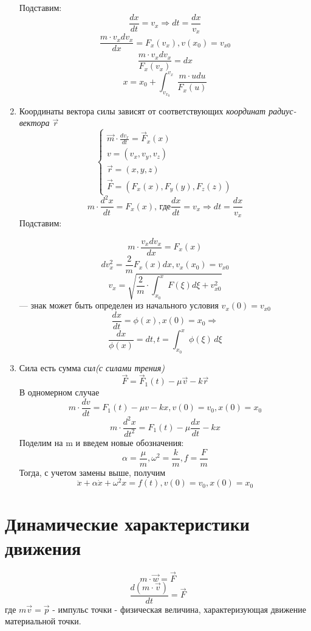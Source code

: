 \documentclass[12pt,a4paper]{report}
\begin{document}
\begin{enumerate}
          Подставим:
          \[ \frac{dx}{dt} = v_x \Rightarrow dt = \frac{dx}{v_x} \]
          \[ \frac{m \cdot v_xdv_x}{dx} = F_x(v_x), v(x_0) = v_{x0} \]
          \[ \frac{m \cdot v_xdv_x}{F_x(v_x)} = dx\]
          \[x = x_0 + \int_{v_{x_0}}^{v_x} \frac{m \cdot udu}{F_x(u)} \]
    \item Координаты вектора силы зависят от соответствующих \textit{координат радиус-вектора $\vec r$}
          \[
              \begin{cases}
                  \vec m \cdot \frac{dv_x}{dt} = \vec F_x(x) \\
                  v = (v_x, v_y, v_z)                        \\
                  \vec r = (x,y,z)                           \\
                  \vec F = (F_x(x), F_y(y), F_z(z))
              \end{cases}
          \]
          \[m \cdot \frac{d^2x}{dt} = F_x(x) \text{, где} \frac{dx}{dt} = v_x \Rightarrow dt = \frac{dx}{v_x}\]
          Подставим:

          \[m\cdot \frac{v_xdv_x}{dx} = F_x(x)\]
          \[dv_x^2 = \frac{2}{m} F_x(x)dx , v_x(x_0) = v_{x0}\]
          \[ v_x = \sqrt{\frac{2}{m} \cdot \int_{x_0}^{x}F(\xi)d\xi + v_{x0}^2}\]
          --- знак может быть определен из начального условия $v_x(0) = v_{x0}$
          \[\frac{dx}{dt} = \phi(x), x(0) = x_0 \Rightarrow \]
          \[\frac{dx}{\phi(x)} = dt, t = \int_{x_0}^{x}\phi(\xi) \,d\xi\]
    \item Сила есть сумма \textit{сил(с силами трения)}
          \[ \vec F = \vec F_1(t) - \mu \vec v - k\vec r\]
          В одномерном случае
          \[m \cdot \frac{dv}{dt} = F_1(t) - \mu v - kx , v(0) = v_0, x(0) = x_0\]
          \[m \cdot \frac{d^2x}{dt^2} = F_1(t) - \mu \frac{dx}{dt} - kx \]
          Поделим на m и введем новые обозначения:
          \[ \alpha = \frac{\mu}{m}, \omega^2 = \frac{k}{m}, f = \frac{F}{m} \]
          Тогда, с учетом замены выше, получим
          \[\ddot x + \alpha \dot x + \omega^2x = f(t), v(0) = v_0, x(0) = x_0\]
\end{enumerate}
\section{Динамические характеристики движения}
\[ m \cdot \vec w = \vec F \]
\[ \frac{d(m \cdot \vec v)}{dt} = \vec F\]
где $m\vec v = \vec p$ - импульс точки - физическая величина, характеризующая движение материальной точки.
\end{document}
